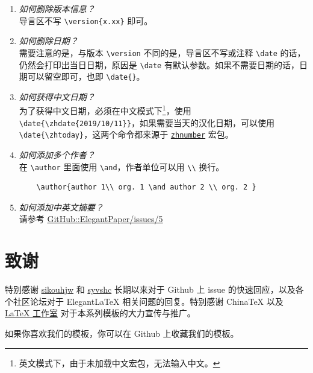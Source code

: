 \documentclass[lang=cn,a4paper,newtx]{elegantpaper}
\begin{document}
\begin{enumerate}[label=\arabic*).]
  \item \textit{如何删除版本信息？}\\
    导言区不写 \lstinline|\version{x.xx}| 即可。
  \item \textit{如何删除日期？}\\
    需要注意的是，与版本 \lstinline{\version} 不同的是，导言区不写或注释 \lstinline{\date} 的话，仍然会打印出当日日期，原因是 \lstinline{\date} 有默认参数。如果不需要日期的话，日期可以留空即可，也即 \lstinline|\date{}|。
  \item \textit{如何获得中文日期？}\\
    为了获得中文日期，必须在中文模式下\footnote{英文模式下，由于未加载中文宏包，无法输入中文。}，使用 \lstinline|\date{\zhdate{2019/10/11}}|，如果需要当天的汉化日期，可以使用 \lstinline|\date{\zhtoday}|，这两个命令都来源于 \href{https://ctan.org/pkg/zhnumber}{\lstinline{zhnumber}} 宏包。
  \item \textit{如何添加多个作者？}\\
    在 \lstinline{\author} 里面使用 \lstinline{\and}，作者单位可以用 \lstinline{\\} 换行。
    \begin{lstlisting}
    \author{author 1\\ org. 1 \and author 2 \\ org. 2 }
    \end{lstlisting}
  \item \textit{如何添加中英文摘要？}\\
    请参考 \href{https://github.com/ElegantLaTeX/ElegantPaper/issues/5}{GitHub::ElegantPaper/issues/5}
\end{enumerate}


\section{致谢}

特别感谢 \href{https://github.com/sikouhjw}{sikouhjw} 和 \href{https://github.com/syvshc}{syvshc}  长期以来对于 Github 上 issue 的快速回应，以及各个社区论坛对于 ElegantLaTeX 相关问题的回复。特别感谢 ChinaTeX 以及 \href{http://www.latexstudio.net/}{LaTeX 工作室} 对于本系列模板的大力宣传与推广。

如果你喜欢我们的模板，你可以在 Github 上收藏我们的模板。

\nocite{*}
\printbibliography[heading=bibintoc, title=\ebibname]

\appendix
\addappheadtotoc
\end{document}

